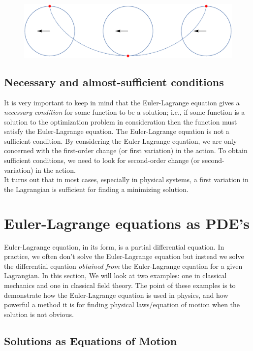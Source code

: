 \documentclass{article}
\begin{document}
\begin{figure}[h!]
	\centering
	\includegraphics[scale=0.35, angle=180]{cycloid.eps}
\end{figure}


\subsection{Necessary and almost-sufficient conditions}
It is very important to keep in mind that the Euler-Lagrange equation gives a \textit{necessary condition} for some function to be a solution; i.e., if some function is a solution to the optimization problem in consideration then the function must satisfy the Euler-Lagrange equation. The Euler-Lagrange equation is not a sufficient condition\cite{CVAR}. By considering the Euler-Lagrange equation, we are only concerned with the first-order change (or first variation) in the action. To obtain sufficient conditions, we need to look for second-order change (or second-variation) in the action. \\

It turns out that in most cases, especially in physical systems, a first variation in the Lagrangian is sufficient for finding a minimizing solution.\cite{FARLOW} 


\section{Euler-Lagrange equations as PDE's}

Euler-Lagrange equation, in its form, is a partial differential equation. In practice, we often don't solve the Euler-Lagrange equation but instead we solve the differential equation \textit{obtained from} the Euler-Lagrange equation for a given Lagrangian. In this section, We will look at two examples: one in classical mechanics and one in classical field theory. The point of these examples is to demonstrate how the Euler-Lagrange equation is used in physics, and how powerful a method it is for finding physical laws/equation of motion when the solution is not obvious. 

\subsection{Solutions as Equations of Motion}
\end{document}
